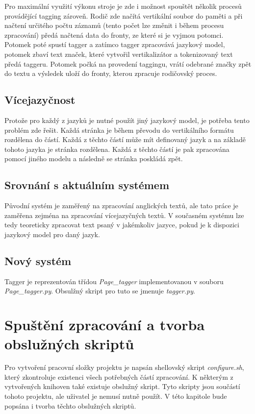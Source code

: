 Pro maximální využití výkonu stroje je zde i možnost spouštět několik procesů provádějící tagging zároveň.
Rodič zde načítá vertikální soubor do paměti a při načtení určitého počtu záznamů (tento počet lze změnit i během procesu zpracování) předá načtená data
do fronty, ze které si je vyjmou potomci. Potomek poté spustí tagger a zatímco tagger zpracovává jazykový model,
potomek zbaví text značek, které vytvořil vertikalizátor a tokenizovaný text předá taggeru. Potomek počká
na provedení taggingu, vrátí odebrané značky zpět do textu a výsledek uloží do fronty, kterou zpracuje rodičovský proces.

\section{Vícejazyčnost}
Protože pro každý z jazyků je nutné použít jiný jazykový model, je potřeba tento problém zde řešit.
Každá stránka je během převodu do vertikálního formátu rozdělena do částí. Každá z těchto částí
může mít definovaný jazyk a na základě tohoto jazyka je stránka rozdělena. Každá z
těchto částí je pak zpracována pomocí jiného modelu a následně se stránka poskládá
zpět.

\section{Srovnání s aktuálním systémem}
Původní systém je zaměřený na zpracování anglických textů, ale tato práce je zaměřena
zejména na zpracování vícejazyčných textů. V současném systému lze tedy teoreticky
zpracovat text psaný v jakémkoliv jazyce, pokud je k dispozici jazykový model
pro daný jazyk.

\section{Nový systém}
Tagger je reprezentován třídou \textit{Page\_tagger} implementovanou v souboru \textit{Page\_tagger.py}. Obsulžný skript pro tuto
se jmenuje \textit{tagger.py}.

\chapter{Spuštění zpracování a tvorba obslužných skriptů}
Pro vytvoření pracovní složky projektu je napsán shellovský skript \textit{configure.sh},
který zkontroluje existenci všech potřebných částí zpracování. K některým z vytvořených knihoven
také existuje obslužný skript. Tyto skripty jsou součástí tohoto projektu, ale uživatel je
nemusí nutně použít. V této kapitole bude popsána i tvorba těchto obslužných skriptů.

